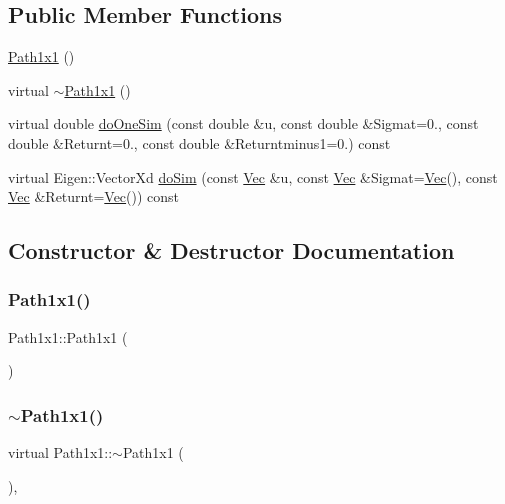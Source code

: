 \subsection*{Public Member Functions}
\begin{DoxyCompactItemize}
\item 
\hyperlink{classPath1x1_a4334fb2dde2817567faeb9dbdad730a4}{Path1x1} ()
\item 
virtual \hyperlink{classPath1x1_a0752d44231023e4d60403708fd8a51a5}{$\sim$\+Path1x1} ()
\item 
virtual double \hyperlink{classPath1x1_a522e73958cc571997153baa179b451cd}{do\+One\+Sim} (const double \&u, const double \&Sigmat=0., const double \&Returnt=0., const double \&Returntminus1=0.) const
\item 
virtual Eigen\+::\+Vector\+Xd \hyperlink{classPath1x1_abd21c19e5283035ebe2ca01711134e4c}{do\+Sim} (const \hyperlink{compute__returns__eigen_8h_a1eb6a9306ef406d7975f3cbf2e247777}{Vec} \&u, const \hyperlink{compute__returns__eigen_8h_a1eb6a9306ef406d7975f3cbf2e247777}{Vec} \&Sigmat=\hyperlink{compute__returns__eigen_8h_a1eb6a9306ef406d7975f3cbf2e247777}{Vec}(), const \hyperlink{compute__returns__eigen_8h_a1eb6a9306ef406d7975f3cbf2e247777}{Vec} \&Returnt=\hyperlink{compute__returns__eigen_8h_a1eb6a9306ef406d7975f3cbf2e247777}{Vec}()) const
\end{DoxyCompactItemize}


\subsection{Constructor \& Destructor Documentation}
\hypertarget{classPath1x1_a4334fb2dde2817567faeb9dbdad730a4}{}\label{classPath1x1_a4334fb2dde2817567faeb9dbdad730a4} 
\subsubsection{\texorpdfstring{Path1x1()}{Path1x1()}}
{\footnotesize\ttfamily Path1x1\+::\+Path1x1 (\begin{DoxyParamCaption}{ }\end{DoxyParamCaption})}

\hypertarget{classPath1x1_a0752d44231023e4d60403708fd8a51a5}{}\label{classPath1x1_a0752d44231023e4d60403708fd8a51a5} 
\subsubsection{\texorpdfstring{$\sim$\+Path1x1()}{~Path1x1()}}
{\footnotesize\ttfamily virtual Path1x1\+::$\sim$\+Path1x1 (\begin{DoxyParamCaption}{ }\end{DoxyParamCaption})\hspace{0.3cm}{\ttfamily [inline]}, {\ttfamily [virtual]}}



